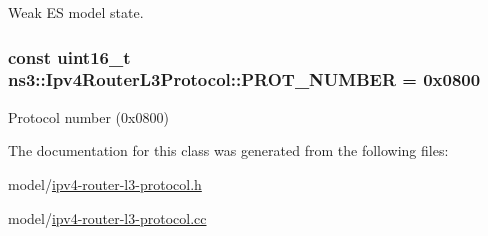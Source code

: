 Weak E\-S model state. 

\hypertarget{classns3_1_1Ipv4RouterL3Protocol_a2fdda6f3cb6e421706acf29bf38e8cd4}{
\subsubsection[{P\-R\-O\-T\-\_\-\-N\-U\-M\-B\-E\-R}]{\setlength{\rightskip}{0pt plus 5cm}const uint16\-\_\-t ns3\-::\-Ipv4\-Router\-L3\-Protocol\-::\-P\-R\-O\-T\-\_\-\-N\-U\-M\-B\-E\-R = 0x0800\hspace{0.3cm}{\ttfamily [static]}}}\label{classns3_1_1Ipv4RouterL3Protocol_a2fdda6f3cb6e421706acf29bf38e8cd4}


Protocol number (0x0800) 



The documentation for this class was generated from the following files\-:\begin{DoxyCompactItemize}
\item 
model/\hyperlink{ipv4-router-l3-protocol_8h}{ipv4-\/router-\/l3-\/protocol.\-h}\item 
model/\hyperlink{ipv4-router-l3-protocol_8cc}{ipv4-\/router-\/l3-\/protocol.\-cc}\end{DoxyCompactItemize}
